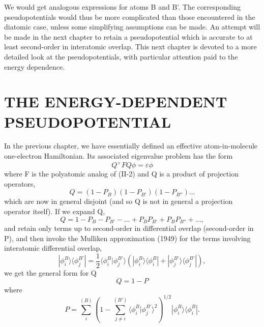 \documentclass[12pt,letterpaper]{report}
\begin{document}
We would get analogous expressions for atoms B and B'. The corresponding pseudopotentials would thus be more complicated than those encountered in the diatomic case, unless some simplifying assumptions can be made. An attempt will be made in the next chapter to retain a pseudopotential which is accurate to at least second-order in interatomic overlap. This next chapter is devoted to a more detailed look at the pseudopotentials, with particular attention paid to the energy dependence.

\chapter{THE ENERGY-DEPENDENT PSEUDOPOTENTIAL}

In the previous chapter, we have essentially defined an effective atom-in-molecule one-electron Hamiltonian. Its associated eigenvalue problem has the form
\begin{equation}
Q^+ F Q \phi = \varepsilon \phi
\end{equation}
where F is the polyatomic analog of (II-2) and Q is a product of projection operators,
\begin{equation}
Q = (1 - P_B)(1 - P_{B'})(1 - P_{B''})...
\end{equation}
which are now in general disjoint (and so Q is not in general a projection operator itself). If we expand Q,
\begin{equation}
Q = 1 - P_B - P_{B'} - ... + P_B P_{B'} + P_B P_{B''} + ...,
\end{equation}
and retain only terms up to second-order in differential overlap (second-order in P), and then invoke the Mulliken approximation (1949) for the terms involving interatomic differential overlap,
\begin{equation}
|\phi_i^B \rangle \langle \phi_j^{B'}| = \frac{1}{2}\langle \phi_i^B | \phi_j^{B'} \rangle \left(|\phi_i^B \rangle \langle \phi_i^B| + |\phi_j^{B'} \rangle \langle \phi_j^{B'}|\right),
\end{equation}
we get the general form for Q
\begin{equation}
Q = 1 - P
\end{equation}
where
\begin{equation}
P = \sum_i^{(B)} \left(1 - \sum_{j \neq i}^{(B')} \langle \phi_i^B | \phi_j^{B'} \rangle^2\right)^{1/2} |\phi_i^B \rangle \langle \phi_i^B|.
\end{equation}
\end{document}
